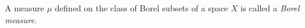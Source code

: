 A measure $\mu$ defined on the class of Borel subsets of a space $X$ is called a \textit{Borel measure}.
